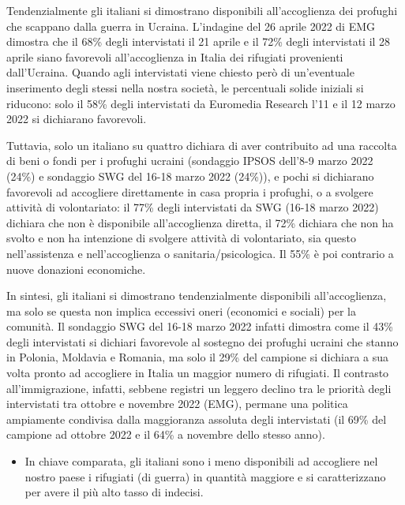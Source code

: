 \documentclass[
]{book}
\providecommand{\tightlist}{%
  \setlength{\itemsep}{0pt}\setlength{\parskip}{0pt}}
\begin{document}
Tendenzialmente gli italiani si dimostrano disponibili all'accoglienza dei profughi che scappano dalla guerra in Ucraina. L'indagine del 26 aprile 2022 di EMG dimostra che il 68\% degli intervistati il 21 aprile e il 72\% degli intervistati il 28 aprile siano favorevoli all'accoglienza in Italia dei rifugiati provenienti dall'Ucraina. Quando agli intervistati viene chiesto però di un'eventuale inserimento degli stessi nella nostra società, le percentuali solide iniziali si riducono: solo il 58\% degli intervistati da Euromedia Research l'11 e il 12 marzo 2022 si dichiarano favorevoli.

Tuttavia, solo un italiano su quattro dichiara di aver contribuito ad una raccolta di beni o fondi per i profughi ucraini (sondaggio IPSOS dell'8-9 marzo 2022 (24\%) e sondaggio SWG del 16-18 marzo 2022 (24\%)), e pochi si dichiarano favorevoli ad accogliere direttamente in casa propria i profughi, o a svolgere attività di volontariato: il 77\% degli intervistati da SWG (16-18 marzo 2022) dichiara che non è disponibile all'accoglienza diretta, il 72\% dichiara che non ha svolto e non ha intenzione di svolgere attività di volontariato, sia questo nell'assistenza e nell'accoglienza o sanitaria/psicologica. Il 55\% è poi contrario a nuove donazioni economiche.

In sintesi, gli italiani si dimostrano tendenzialmente disponibili all'accoglienza, ma solo se questa non implica eccessivi oneri (economici e sociali) per la comunità. Il sondaggio SWG del 16-18 marzo 2022 infatti dimostra come il 43\% degli intervistati si dichiari favorevole al sostegno dei profughi ucraini che stanno in Polonia, Moldavia e Romania, ma solo il 29\% del campione si dichiara a sua volta pronto ad accogliere in Italia un maggior numero di rifugiati. Il contrasto all'immigrazione, infatti, sebbene registri un leggero declino tra le priorità degli intervistati tra ottobre e novembre 2022 (EMG), permane una politica ampiamente condivisa dalla maggioranza assoluta degli intervistati (il 69\% del campione ad ottobre 2022 e il 64\% a novembre dello stesso anno).

\begin{itemize}
\tightlist
\item
  In chiave comparata, gli italiani sono i meno disponibili ad accogliere nel nostro paese i rifugiati (di guerra) in quantità maggiore e si caratterizzano per avere il più alto tasso di indecisi.
\end{itemize}
\end{document}
